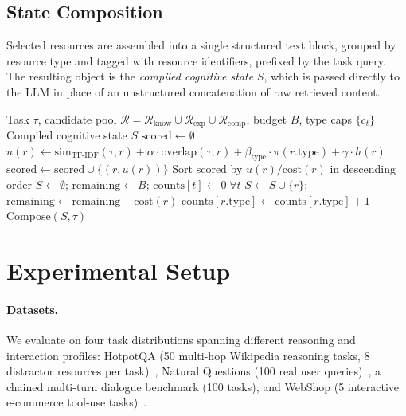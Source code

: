 \documentclass{article}
\begin{document}
\subsection{State Composition}
Selected resources are assembled into a single structured text block, grouped by resource type and tagged with resource identifiers, prefixed by the task query. The resulting object is the \emph{compiled cognitive state} $S$, which is passed directly to the LLM in place of an unstructured concatenation of raw retrieved content.

\begin{algorithm}[t]
\caption{Cognitive State Compilation}
\label{alg:csc}
\begin{algorithmic}[1]
\Require Task $\tau$, candidate pool $\mathcal{R} = \mathcal{R}_{\text{know}} \cup \mathcal{R}_{\text{exp}} \cup \mathcal{R}_{\text{comp}}$, budget $B$, type caps $\{c_t\}$
\Ensure Compiled cognitive state $S$
\State $\text{scored} \gets \emptyset$
    \State $u(r) \gets \text{sim}_{\text{TF-IDF}}(\tau, r) + \alpha \cdot \text{overlap}(\tau, r) + \beta_{\text{type}} \cdot \pi(r.\text{type}) + \gamma \cdot h(r)$ 
    \State $\text{scored} \gets \text{scored} \cup \{(r, u(r))\}$
\EndFor
\State Sort $\text{scored}$ by $u(r)/\text{cost}(r)$ in descending order 
\State $S \gets \emptyset$; $\text{remaining} \gets B$; $\text{counts}[t] \gets 0 \; \forall t$
        \State $S \gets S \cup \{r\}$; $\text{remaining} \gets \text{remaining} - \text{cost}(r)$
        \State $\text{counts}[r.\text{type}] \gets \text{counts}[r.\text{type}] + 1$
    \EndIf
\EndFor
\State \Return Compose$(S, \tau)$ 
\end{algorithmic}
\end{algorithm}

\section{Experimental Setup}
\label{sec:setup}

\paragraph{Datasets.} We evaluate on four task distributions spanning different reasoning and interaction profiles: HotpotQA (50 multi-hop Wikipedia reasoning tasks, 8 distractor resources per task)~\citep{yang2018hotpotqa}, Natural Questions (100 real user queries)~\citep{kwiatkowski2019natural}, a chained multi-turn dialogue benchmark (100 tasks), and WebShop (5 interactive e-commerce tool-use tasks)~\citep{yao2022webshop}.
\end{document}
